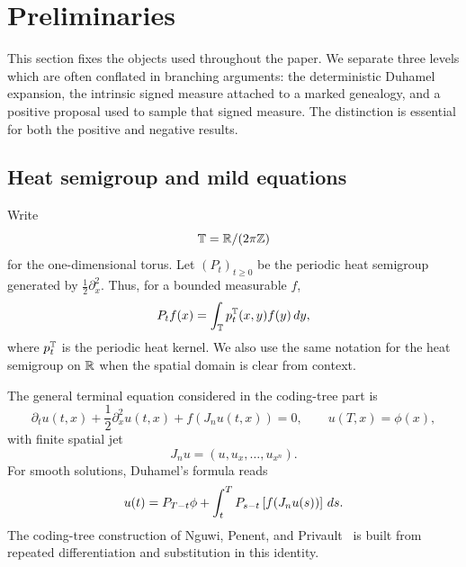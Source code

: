 \section{Preliminaries}
\label{sec:preliminaries}

This section fixes the objects used throughout the paper. We separate three levels which are often conflated in branching arguments: the deterministic Duhamel expansion, the intrinsic signed measure attached to a marked genealogy, and a positive proposal used to sample that signed measure. The distinction is essential for both the positive and negative results.

\subsection{Heat semigroup and mild equations}

Write
\begin{equation*}
  \mathbb T=\mathbb R/(2\pi\mathbb Z)
\end{equation*}
for the one-dimensional torus. Let $(P_t)_{t\geq0}$ be the periodic heat semigroup generated by $\frac12\partial_x^2$. Thus, for a bounded measurable $f$,
\begin{equation*}
  P_tf(x)=\int_{\mathbb T}p_t^{\mathbb T}(x,y)f(y)\,dy,
\end{equation*}
where $p_t^{\mathbb T}$ is the periodic heat kernel. We also use the same notation for the heat semigroup on $\mathbb R$ when the spatial domain is clear from context.

The general terminal equation considered in the coding-tree part is
\begin{equation}
  \partial_tu(t,x)
  +\frac12\partial_x^2u(t,x)
  +f(J_nu(t,x))=0,
  \qquad
  u(T,x)=\phi(x),
  \label{eq:general-terminal-pde}
\end{equation}
with finite spatial jet
\begin{equation*}
  J_nu=(u,u_x,\ldots,u_{x^n}).
\end{equation*}
For smooth solutions, Duhamel's formula reads
\begin{equation*}
  u(t)
  =
  P_{T-t}\phi
  +\int_t^T
  P_{s-t}\left[f(J_nu(s))\right]\,ds.
\end{equation*}
The coding-tree construction of Nguwi, Penent, and Privault~\cite{NguwiPenentPrivault2023} is built from repeated differentiation and substitution in this identity.

